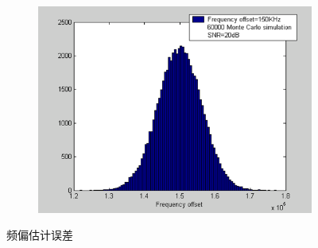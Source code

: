 \begin{figure}
	\begin{subfigure}[htb]{0.5\textwidth}
		\centering
		\includegraphics[width=\textwidth]{SimCFO3.png}
	\end{subfigure}
	\caption{频偏估计误差}\label{fig:cfovar}
\end{figure}











